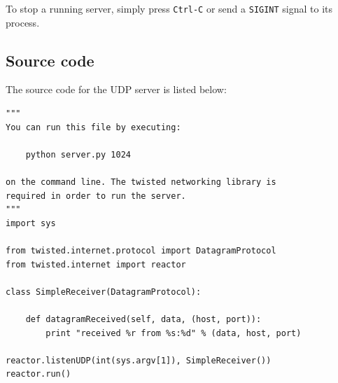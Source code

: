 \documentclass[10pt,a4paper,twoside,onecolumn]{article}
\begin{document}
To stop a running server, simply press \texttt{Ctrl-C} or send a \texttt{SIGINT} signal to its process.



\subsection{Source code}
\label{sec:src-code}

The source code for the UDP server is listed below:

\lstset{caption=,label=lst:udp-server,language=python,numbers=left}
\begin{lstlisting}
"""
You can run this file by executing:

    python server.py 1024

on the command line. The twisted networking library is
required in order to run the server.
"""
import sys

from twisted.internet.protocol import DatagramProtocol
from twisted.internet import reactor

class SimpleReceiver(DatagramProtocol):

    def datagramReceived(self, data, (host, port)):
        print "received %r from %s:%d" % (data, host, port)

reactor.listenUDP(int(sys.argv[1]), SimpleReceiver())
reactor.run()
\end{lstlisting}
\end{document}
